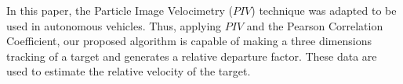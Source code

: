 In this paper, the Particle Image Velocimetry ($PIV$) technique was adapted to be used in autonomous vehicles.
Thus, applying $PIV$ and the Pearson Correlation Coefficient, our proposed algorithm 
is capable of making a three dimensions tracking of a target 
and generates a relative departure factor. These data are used to estimate the 
relative velocity of the target.